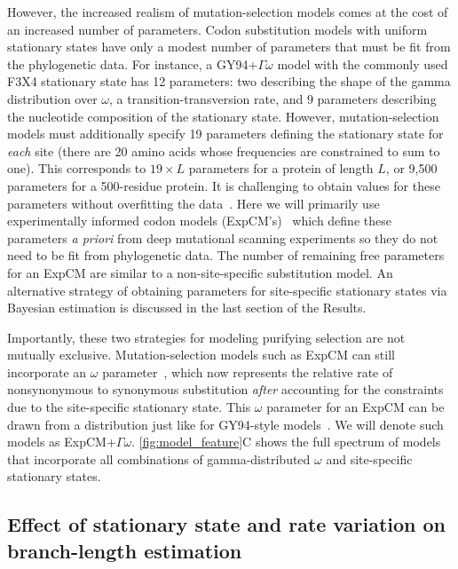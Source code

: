 \documentclass[11pt]{article}
\begin{document}
However, the increased realism of mutation-selection models comes at the cost of an increased number of parameters. 
Codon substitution models with uniform stationary states have only a modest number of parameters that must be fit from the phylogenetic data.
For instance, a GY94+$\Gamma\omega$ model with the commonly used F3X4 stationary state has 12 parameters: two describing the shape of the gamma distribution over $\omega$, a transition-transversion rate, and 9 parameters describing the nucleotide composition of the stationary state.
However, mutation-selection models must additionally specify 19 parameters defining the stationary state for \emph{each} site (there are 20 amino acids whose frequencies are constrained to sum to one).
This corresponds to $19\times L$ parameters for a protein of length $L$, or 9,500 parameters for a 500-residue protein.
It is challenging to obtain values for these parameters without overfitting the data~\citep{rodrigue2013statistical}.
Here we will primarily use experimentally informed codon models (ExpCM's)~\citep{bloom2014experimentally, hilton2017phydms, bloom2017identification} which define these parameters \textit{a priori} from deep mutational scanning experiments so they do not need to be fit from phylogenetic data.
The number of remaining free parameters for an ExpCM are similar to a non-site-specific substitution model.
An alternative strategy of obtaining parameters for site-specific stationary states via Bayesian \citep{lartillot2004bayesian, rodrigue2014site} estimation is discussed in the last section of the Results.

Importantly, these two strategies for modeling purifying selection are not mutually exclusive.
Mutation-selection models such as ExpCM can still incorporate an $\omega$ parameter~\citep{rodrigue2016detecting, bloom2017identification}, which now represents the relative rate of nonsynonymous to synonymous substitution \emph{after} accounting for the constraints due to the site-specific stationary state.
This $\omega$ parameter for an ExpCM can be drawn from a distribution just like for GY94-style models~\citep{haddox2017mapping, rodrigue2014site}. 
We will denote such models as ExpCM+$\Gamma\omega$.
\ref{fig:model_feature}C shows the full spectrum of models that incorporate all combinations of gamma-distributed $\omega$ and site-specific stationary states.

\subsection*{Effect of stationary state and rate variation on branch-length estimation}
\end{document}
